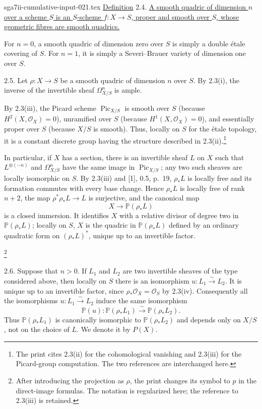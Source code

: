 \begin{filecontents*}{sga7ii-cumulative-input-021.tex}
\underline{Definition} 2.4. \underline{A smooth quadric of dimension
$n$ over a scheme $S$ is an $S$-scheme $f:X\longrightarrow S$, proper
and smooth over $S$, whose geometric fibres are smooth quadrics.}

For $n=0$, a smooth quadric of dimension zero over $S$ is simply a
double \'{e}tale covering of $S$.  For $n=1$, it is simply a
Severi--Brauer variety of dimension one over $S$.

2.5. Let $\rho:X\longrightarrow S$ be a smooth quadric of dimension $n$
over $S$.  By 2.3(i), the inverse of the invertible sheaf
$\Omega^n_{X/S}$ is ample.


By 2.3(iii), the Picard scheme $\operatorname{Pic}_{X/S}$ is smooth over
$S$ (because $H^2(X,\mathcal O_X)=0$), unramified over $S$ (because
$H^1(X,\mathcal O_X)=0$), and essentially proper over $S$ (because
$X/S$ is smooth).  Thus, locally on $S$ for the \'{e}tale topology, it
is a constant discrete group having the structure described in
2.3(ii).\footnote{The print cites 2.3(ii) for the cohomological
vanishing and 2.3(iii) for the Picard-group computation.  The two
references are interchanged here.}

In particular, if $X$ has a section, there is an invertible sheaf $L$ on
$X$ such that $L^{\otimes(-n)}$ and $\Omega^n_{X/S}$ have the same image
in $\operatorname{Pic}_{X/S}$; any two such sheaves are locally
isomorphic on $S$.  By 2.3(iii) and [1], 0.5, p.~19,
$\rho_*L$ is locally free and its formation commutes with every base
change.  Hence $\rho_*L$ is locally free of rank $n+2$, the map
$\rho^*\rho_*L\longrightarrow L$ is surjective, and the canonical map
\begin{equation*}
X\longrightarrow\mathbb P(\rho_*L)
\end{equation*}
is a closed immersion.  It identifies $X$ with a relative divisor of
degree two in $\mathbb P(\rho_*L)$; locally on $S$, $X$ is the quadric in
$\mathbb P(\rho_*L)$ defined by an ordinary quadratic form on
$(\rho_*L)^*$, unique up to an invertible factor.

\footnote{After introducing the projection as $\rho$, the print changes
its symbol to $p$ in the direct-image formulas.  The notation is
regularized here; the reference to 2.3(iii) is retained.}

2.6. Suppose that $n>0$.  If $L_1$ and $L_2$ are two invertible sheaves
of the type considered above, then locally on $S$ there is an
isomorphism $u:L_1\xrightarrow{\sim}L_2$.  It is unique up to an
invertible factor, since $\rho_*\mathcal O_X=\mathcal O_S$ by 2.3(iv).
Consequently all the isomorphisms $u:L_1\xrightarrow{\sim}L_2$ induce
the same isomorphism
\begin{equation*}
\mathbb P(u):\mathbb P(\rho_*L_1)\xrightarrow{\sim}
\mathbb P(\rho_*L_2).
\end{equation*}
Thus $\mathbb P(\rho_*L_1)$ is canonically isomorphic to
$\mathbb P(\rho_*L_2)$ and depends only on $X/S$, not on the choice of
$L$.  We denote it by $P(X)$.


\end{filecontents*}
